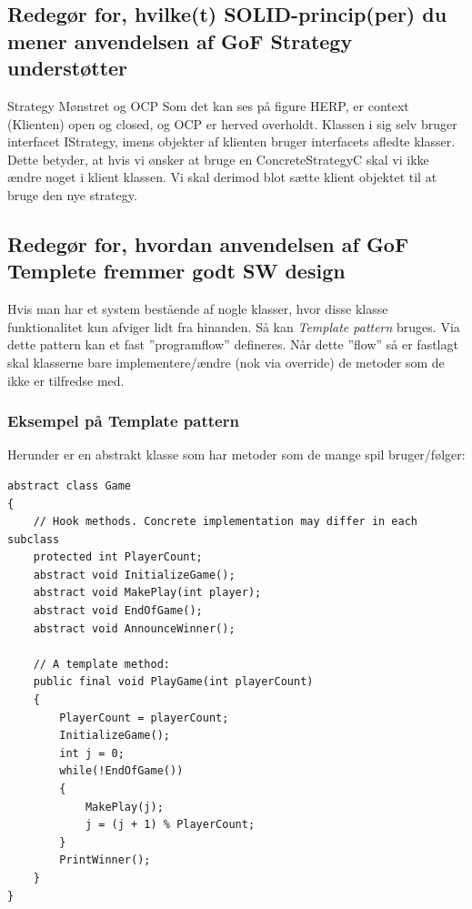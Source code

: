 \subsection{Redegør for, hvilke(t) SOLID-princip(per) du mener anvendelsen af GoF Strategy understøtter}

Strategy Mønstret og OCP
Som det kan ses på figure HERP, er context (Klienten) open og closed, og OCP er herved overholdt. Klassen i sig selv bruger interfacet IStrategy, imens objekter af klienten bruger interfacets afledte klasser. Dette betyder, at hvis vi ønsker at bruge en ConcreteStrategyC skal vi ikke ændre noget i klient klassen. Vi skal derimod blot sætte klient objektet til at bruge den nye strategy.

\subsection{Redegør for, hvordan anvendelsen af GoF Templete fremmer godt SW design}
Hvis man har et system bestående af nogle klasser, hvor disse klasse funktionalitet kun afviger lidt fra hinanden. Så kan \textit{Template pattern} bruges. Via dette pattern kan et fast ''programflow'' defineres. Når dette ''flow'' så er fastlagt skal klasserne bare implementere/ændre (nok via override) de metoder som de ikke er tilfredse med.

\subsubsection{Eksempel på Template pattern}
Herunder er en abstrakt klasse som har metoder som de mange spil bruger/følger:

\begin{lstlisting}
abstract class Game 
{
	// Hook methods. Concrete implementation may differ in each subclass
	protected int PlayerCount;
	abstract void InitializeGame();
	abstract void MakePlay(int player);
	abstract void EndOfGame();
	abstract void AnnounceWinner();
	
	// A template method:
	public final void PlayGame(int playerCount)
	{
		PlayerCount = playerCount;
		InitializeGame();
		int j = 0;
		while(!EndOfGame())
		{
			MakePlay(j);
			j = (j + 1) % PlayerCount;
		}
		PrintWinner();
	}
}
\end{lstlisting}








